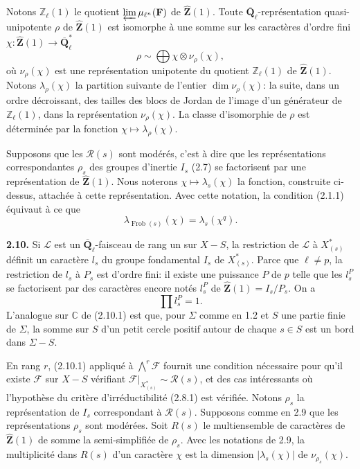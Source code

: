 \documentclass[11pt]{article}
\newcommand{\F}{\mathbf{F}}
\newcommand{\Qbl}{\overline{\mathbf{Q}}_{\ell}}
\newcommand{\Frob}{\operatorname{Frob}}
\newcommand{\Z}{\mathbb{Z}}
\newcommand{\Zhat}{\widehat{\mathbf{Z}}}
\newcommand{\C}{\mathbb{C}}
\newcommand{\Rcal}{\mathcal{R}}
\newcommand{\Fcal}{\mathcal{F}}
\newcommand{\Lcal}{\mathcal{L}}
\newcommand{\para}[1]{\medskip\noindent\textbf{#1}\enspace}
\begin{document}
Notons \(\Z_\ell(1)\) le quotient \(\varprojlim \mu_{\ell^n}(\F)\) de \(\Zhat(1)\). Toute \(\Qbl\)-représentation quasi-unipotente \(\rho\) de \(\Zhat(1)\) est isomorphe à une somme sur les caractères d'ordre fini \(\chi:\Zhat(1)\to \Qbl^*\)
\begin{equation}
\rho\sim\bigoplus \chi\otimes \nu_\rho(\chi),
\tag{2.9.4}
\end{equation}
où \(\nu_\rho(\chi)\) est une représentation unipotente du quotient \(\Z_\ell(1)\) de \(\Zhat(1)\). Notons \(\lambda_\rho(\chi)\) la partition suivante de l'entier \(\dim \nu_\rho(\chi)\): la suite, dans un ordre décroissant, des tailles des blocs de Jordan de l'image d'un générateur de \(\Z_\ell(1)\), dans la représentation \(\nu_\rho(\chi)\). La classe d'isomorphie de \(\rho\) est déterminée par la fonction \(\chi\mapsto\lambda_\rho(\chi)\).

Supposons que les \(\Rcal(s)\) sont modérés, c'est à dire que les représentations correspondantes \(\rho_s\) des groupes d'inertie \(I_s\) (2.7) se factorisent par une représentation de \(\Zhat(1)\). Nous noterons \(\chi\mapsto\lambda_s(\chi)\) la fonction, construite ci-dessus, attachée à cette représentation. Avec cette notation, la condition (2.1.1) équivaut à ce que
\begin{equation}
\lambda_{\Frob(s)}(\chi)=\lambda_s(\chi^q).
\tag{2.9.5}
\end{equation}

\para{2.10.} Si \(\Lcal\) est un \(\Qbl\)-faisceau de rang un sur \(X-S\), la restriction de \(\Lcal\) à \(X^*_{(s)}\) définit un caractère \(l_s\) du groupe fondamental \(I_s\) de \(X^*_{(s)}\). Parce que \(\ell\ne p\), la restriction de \(l_s\) à \(P_s\) est d'ordre fini: il existe une puissance \(P\) de \(p\) telle que les \(l_s^P\) se factorisent par des caractères encore notés \(l_s^P\) de \(\Zhat(1)=I_s/P_s\). On a
\begin{equation}
\prod l_s^P=1.
\tag{2.10.1}
\end{equation}
L'analogue sur \(\C\) de (2.10.1) est que, pour \(\Sigma\) comme en 1.2 et \(S\) une partie finie de \(\Sigma\), la somme sur \(S\) d'un petit cercle positif autour de chaque \(s\in S\) est un bord dans \(\Sigma-S\).

En rang \(r\), (2.10.1) appliqué à \(\bigwedge^r \Fcal\) fournit une condition nécessaire pour qu'il existe \(\Fcal\) sur \(X-S\) vérifiant \(\Fcal|_{X^*_{(s)}}\sim\Rcal(s)\), et des cas intéressants où l'hypothèse du critère d'irréductibilité (2.8.1) est vérifiée. Notons \(\rho_s\) la représentation de \(I_s\) correspondant à \(\Rcal(s)\). Supposons comme en 2.9 que les représentations \(\rho_s\) sont modérées. Soit \(R(s)\) le multiensemble de caractères de \(\Zhat(1)\) de somme la semi-simplifiée de \(\rho_s\). Avec les notations de 2.9, la multiplicité dans \(R(s)\) d'un caractère \(\chi\) est la dimension \(|\lambda_s(\chi)|\) de \(\nu_{\rho_s}(\chi)\).
\end{document}
